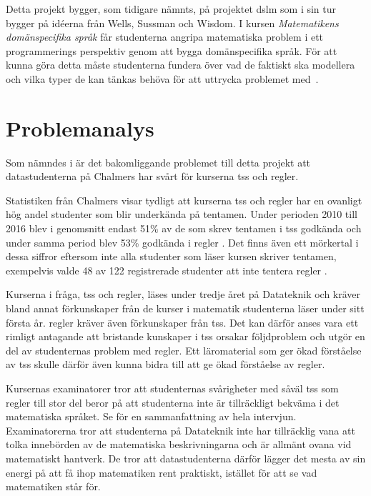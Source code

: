 \documentclass[12pt,a4paper,twoside,openright]{article}
\begin{document}
Detta projekt bygger, som tidigare nämnts, på projektet \gls{dslm} som
i sin tur bygger på idéerna från Wells, Sussman och Wisdom.  I kursen
\textit{Matematikens domänspecifika språk} får studenterna
angripa matematiska problem i ett programmerings perspektiv
genom att bygga domänspecifika språk. För att kunna göra detta måste
studenterna fundera över vad de faktiskt ska modellera och vilka typer
de kan tänkas behöva för att uttrycka problemet
med~\cite{kursplan:dslsofmath}.

\newpage

\section{Problemanalys}
Som nämndes i  är det bakomliggande
problemet till detta projekt att datastudenterna
på Chalmers har svårt för kurserna \gls{tss} och \gls{regler}.

Statistiken från Chalmers visar tydligt att kurserna \gls{tss} och
\gls{regler} har en ovanligt hög andel studenter som blir underkända
på tentamen. Under perioden 2010 till 2016 blev i genomsnitt endast
51\% av de som skrev tentamen i \gls{tss} godkända och under samma
period blev 53\% godkända i \gls{regler} \cite{tentastatistik}.
Det finns även ett mörkertal i dessa siffror eftersom inte alla
studenter som läser kursen skriver tentamen, exempelvis valde 48 av
122 registrerade studenter att inte tentera \gls{regler}
\cite{kursinformation:ere102:14-15}.

Kurserna i fråga, \gls{tss} och \gls{regler}, läses under tredje året
på Datateknik och kräver bland annat förkunskaper från de kurser i
matematik studenterna läser under sitt första år. \gls{regler} kräver
även förkunskaper från \gls{tss}. Det kan därför anses vara ett
rimligt antagande att bristande kunskaper i \gls{tss} orsakar
följdproblem och utgör en del av studenternas problem med
\gls{regler}. Ett läromaterial som ger ökad förståelse av \gls{tss}
skulle därför även kunna bidra till att ge ökad förståelse av \gls{regler}.

Kursernas examinatorer tror att studenternas svårigheter med
såväl \gls{tss} som \gls{regler}
till stor del beror på att studenterna inte är tillräckligt bekväma i
det matematiska språket. Se  för en
sammanfattning av hela intervjun. Examinatorerna tror att studenterna
på Datateknik inte har tillräcklig vana att tolka innebörden av de
matematiska beskrivningarna och är allmänt ovana vid matematiskt
hantverk. De tror att datastudenterna därför lägger det mesta av sin
energi på att få ihop matematiken rent praktiskt, istället för att se
vad matematiken står för.
\end{document}
